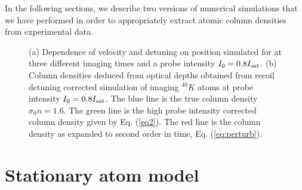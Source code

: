 In the following sections, we describe two versions of numerical simulations that we have performed in order to appropriately extract atomic column densities from experimental data.  
%
\begin{figure}
\caption[Recoil induced detuning]{(a) Dependence of velocity and detuning on position simulated for \K{} at three different imaging times and a probe intensity $I_0=0.8 I_{\rm sat}$. (b) Column densities deduced from optical depths obtained from recoil detuning corrected simulation of imaging $^{40}K$ atoms at probe intensity $I_0=0.8 I_{\rm sat}$. The blue line is the true column density $\sigma_0 n=1.6$. The green line is the high probe intensity corrected column density given by Eq. (\ref{eq2}). The red line is the column density as expanded to second order in time, Eq. (\ref{eq:perturb}).}
\label{fig:expos}
\end{figure}


\section{Stationary atom model}

